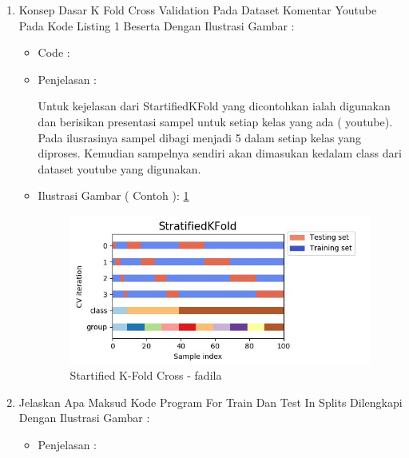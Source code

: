 \begin{enumerate}
\par
\par
\item Konsep Dasar K Fold Cross Validation Pada Dataset Komentar Youtube Pada Kode Listing 1 Beserta Dengan Ilustrasi Gambar :
\begin{itemize}
\item Code		:

\item Penjelasan	: 
\par Untuk kejelasan dari StartifiedKFold yang dicontohkan ialah digunakan dan berisikan presentasi sampel untuk setiap kelas yang ada ( youtube). Pada ilusrasinya sampel dibagi menjadi 5 dalam setiap kelas yang diproses. Kemudian sampelnya sendiri akan dimasukan kedalam class dari dataset youtube yang digunakan.
\par
\item Ilustrasi Gambar ( Contoh ): \ref{chapter-7-starfied-k-fold-cross-fadila}
\par
\par
\begin{figure}[!hbtp]
\centering
\includegraphics[scale=0.2]{figures/chapter-7-starfied-k-fold-cross-fadila.jpg}
\caption{Startified K-Fold Cross - fadila}
\label{chapter-7-starfied-k-fold-cross-fadila}
\end{figure}
\par
\par
\end{itemize}
\par
\par
\par
\item Jelaskan Apa Maksud Kode Program For Train Dan Test In Splits Dilengkapi Dengan Ilustrasi Gambar :
\begin{itemize}
\item Penjelasan	:

\end{itemize}
\end{enumerate}

